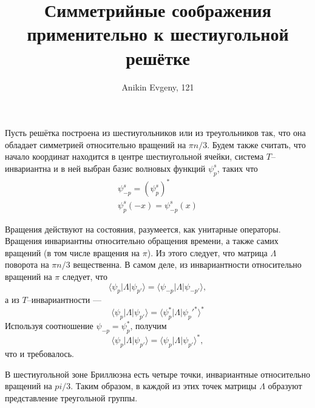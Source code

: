\documentclass{article}
\title{Симметрийные соображения применительно к шестиугольной решётке}
\author{Anikin Evgeny, 121}
\newcommand{\tpi}{\tilde{T}}
\begin{document}
\maketitle
Пусть решётка построена из шестиугольников или из треугольников так, что она обладает 
симметрией относительно вращений на $\pi n/3$. Будем также считать, что начало
координат находится в центре шестиугольной ячейки, система 
$T$--инвариантна и в ней выбран базис волновых функций $\psi^s_p$, таких что
\begin{equation}
	\begin{gathered}
		\psi^s_{-p} = (\psi^s_p)^*\\
		\psi^s_{p}(-x) = \psi^s_{-p}(x)
	\end{gathered}
\end{equation}

%
%

Вращения действуют на состояния, разумеется, как унитарные операторы. Вращения инвариантны
относительно обращения времени, а также самих вращений (в том числе вращения на $\pi$). 
Из этого следует, что матрица $\Lambda$ поворота на $\pi n/3$ вещественна.
В самом деле, из инвариантности относительно вращений на $\pi$ следует, что
\begin{equation*}
	\langle \psi_p | \Lambda | \psi_{p'} \rangle = 
		\langle \psi_{-p} | \Lambda | \psi_{-p'} \rangle,
\end{equation*}
а из $T$--инвариантности --- 
\begin{equation*}
	\langle \psi_p | \Lambda | \psi_{p'} \rangle = 
		\langle \psi_p^* | \Lambda | \psi_p'^* \rangle^*
\end{equation*}
Используя соотношение $\psi_{-p} = \psi_p^*$, получим 
\begin{equation}
		\langle \psi_{p} | \Lambda | \psi_{p'} \rangle =
		\langle \psi_{p} | \Lambda | \psi_{p'} \rangle^*,
\end{equation}
что и требовалось.

В шестиугольной зоне Бриллюэна есть четыре точки, инвариантные относительно вращений на 
$pi/3$. Таким образом, в каждой из этих точек матрицы $\Lambda$ образуют представление
треугольной группы.
\end{document}
